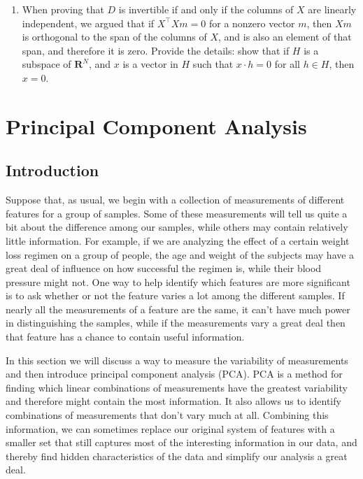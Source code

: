 \documentclass[
  11pt,
  letterpaper,
]{scrbook}
\providecommand{\tightlist}{%
  \setlength{\itemsep}{0pt}\setlength{\parskip}{0pt}}\usepackage{longtable,booktabs,array}
\theoremstyle{plain}
\theoremstyle{remark}
\begin{document}
\begin{enumerate}
\def\labelenumi{\arabic{enumi}.}
\tightlist
\item
  When proving that \(D\) is invertible if and only if the columns of
  \(X\) are linearly independent, we argued that if
  \(X^{\intercal}Xm=0\) for a nonzero vector \(m\), then \(Xm\) is
  orthogonal to the span of the columns of \(X\), and is also an element
  of that span, and therefore it is zero. Provide the details: show that
  if \(H\) is a subspace of \(\mathbf{R}^{N}\), and \(x\) is a vector in
  \(H\) such that \(x\cdot h=0\) for all \(h\in H\), then \(x=0\).
\end{enumerate}


\hypertarget{principal-component-analysis}{%
\chapter{Principal Component
Analysis}\label{principal-component-analysis}}

\hypertarget{introduction}{%
\section{Introduction}\label{introduction}}

Suppose that, as usual, we begin with a collection of measurements of
different features for a group of samples. Some of these measurements
will tell us quite a bit about the difference among our samples, while
others may contain relatively little information. For example, if we are
analyzing the effect of a certain weight loss regimen on a group of
people, the age and weight of the subjects may have a great deal of
influence on how successful the regimen is, while their blood pressure
might not. One way to help identify which features are more significant
is to ask whether or not the feature varies a lot among the different
samples. If nearly all the measurements of a feature are the same, it
can't have much power in distinguishing the samples, while if the
measurements vary a great deal then that feature has a chance to contain
useful information.

In this section we will discuss a way to measure the variability of
measurements and then introduce principal component analysis (PCA). PCA
is a method for finding which linear combinations of measurements have
the greatest variability and therefore might contain the most
information. It also allows us to identify combinations of measurements
that don't vary much at all. Combining this information, we can
sometimes replace our original system of features with a smaller set
that still captures most of the interesting information in our data, and
thereby find hidden characteristics of the data and simplify our
analysis a great deal.
\end{document}

